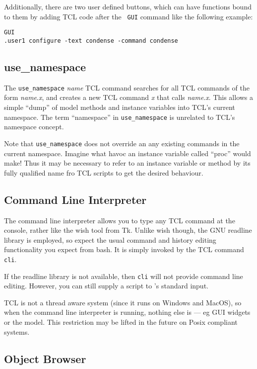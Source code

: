 Additionally, there are two user defined
buttons, which can have
functions bound to them by adding TCL code after the {\tt
  GUI} command like the following example:
\begin{verbatim}
GUI
.user1 configure -text condense -command condense
\end{verbatim}

\subsection{use\_namespace}\label{use_namespace}

The \verb+use_namespace+ {\em name} TCL command searches for all TCL
commands of the form {\em name}.{\em x}, and creates a new TCL command
{\em x} that calls {\em name}.{\em x}. This allows a simple ``dump''
of \EcoLab{} model methods and instance variables into TCL's current
namespace. The term ``namespace'' in \verb+use_namespace+ is unrelated
to TCL's namespace concept.

Note that \verb+use_namespace+ does not override an any existing
commands in the current namespace. Imagine what havoc an instance
variable called ``proc'' would make! Thus it may be necessary to refer
to an instance variable or method by its fully qualified name fro TCL
scripts to get the desired behaviour.

\subsection{Command Line Interpreter}\label{cli}

The command line interpreter allows you to type any TCL command at the
console, rather like the wish tool from Tk. Unlike wish though, the
GNU readline library is employed, so expect the usual command and
history editing functionality you expect from bash. It is simply
invoked by the TCL command \verb+cli+.

If the readline library is not available, then \verb+cli+ will not
provide command line editing. However, you can still supply a script
to \EcoLab's standard input.

TCL is not a thread aware system (since it runs on Windows and MacOS),
so when the command line interpreter is running, nothing else is --- eg
GUI widgets or the model. This restriction may be lifted in the future
on Posix compliant systems.

\subsection{Object Browser}\label{object-browser}

